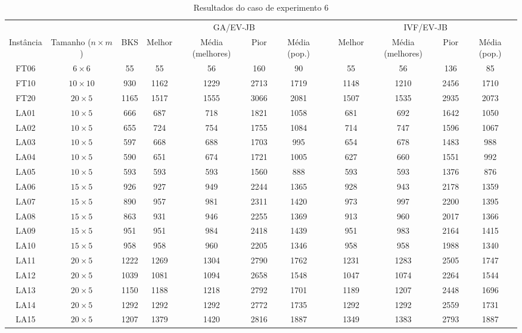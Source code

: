 \begin{sidewaystable}
\caption{Resultados do caso de experimento 6}
\centering
\label{experimento6}
\begin{tabular}{cccccccccccc}
\toprule
& & & \multicolumn{4}{c}{GA/EV-JB} & & \multicolumn{4}{c}{IVF/EV-JB} \\
\cmidrule(c){4-7}
\cmidrule(c){9-12}
Inst\^{a}ncia & Tamanho ($n \times m$) & BKS & Melhor & M\'{e}dia (melhores) & Pior & M\'{e}dia (pop.) & & Melhor & M\'{e}dia (melhores) & Pior & M\'{e}dia (pop.) \\
\midrule
FT06 & $6 \times 6$ & 55 & 55 & 56 & 160 & 90 & & 55 & 56 & 136 & 85 \\
FT10 & $10 \times 10$ & 930 & 1162 & 1229 & 2713 & 1719 & & 1148 & 1210 & 2456 & 1710 \\
FT20 & $20 \times 5$ & 1165 & 1517 & 1555 & 3066 & 2081 & & 1507 & 1535 & 2935 & 2073 \\
LA01 & $10 \times 5$ & 666 & 687 & 718 & 1821 & 1058 & & 681 & 692 & 1642 & 1050 \\
LA02 & $10 \times 5$ & 655 & 724 & 754 & 1755 & 1084 & & 714 & 747 & 1596 & 1067 \\
LA03 & $10 \times 5$ & 597 & 668 & 688 & 1703 & 995 & & 654 & 678 & 1483 & 988 \\
LA04 & $10 \times 5$ & 590 & 651 & 674 & 1721 & 1005 & & 627 & 660 & 1551 & 992 \\
LA05 & $10 \times 5$ & 593 & 593 & 593 & 1560 & 888 & & 593 & 593 & 1376 & 876 \\
LA06 & $15 \times 5$ & 926 & 927 & 949 & 2244 & 1365 & & 928 & 943 & 2178 & 1359 \\
LA07 & $15 \times 5$ & 890 & 957 & 981 & 2311 & 1420 & & 973 & 997 & 2200 & 1395 \\
LA08 & $15 \times 5$ & 863 & 931 & 946 & 2255 & 1369 & & 913 & 960 & 2017 & 1366 \\
LA09 & $15 \times 5$ & 951 & 951 & 984 & 2418 & 1439 & & 951 & 983 & 2164 & 1415 \\
LA10 & $15 \times 5$ & 958 & 958 & 960 & 2205 & 1346 & & 958 & 958 & 1988 & 1340 \\
LA11 & $20 \times 5$ & 1222 & 1269 & 1304 & 2790 & 1762 & & 1231 & 1283 & 2505 & 1747 \\
LA12 & $20 \times 5$ & 1039 & 1081 & 1094 & 2658 & 1548 & & 1047 & 1074 & 2264 & 1544 \\
LA13 & $20 \times 5$ & 1150 & 1188 & 1218 & 2792 & 1701 & & 1189 & 1207 & 2448 & 1696 \\
LA14 & $20 \times 5$ & 1292 & 1292 & 1292 & 2772 & 1735 & & 1292 & 1292 & 2559 & 1731 \\
LA15 & $20 \times 5$ & 1207 & 1379 & 1420 & 2816 & 1887 & & 1349 & 1383 & 2793 & 1887 \\
\bottomrule
\end{tabular}
\end{sidewaystable}
